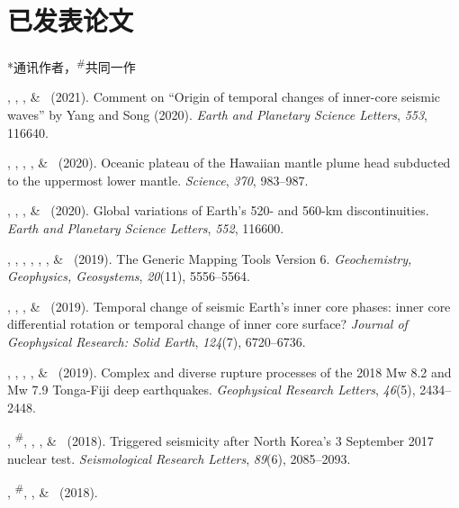\section{已发表论文}
\newcommand{\Revision}{\emph{正在审稿}}
\newcommand{\CS}{*} %
\newcommand{\CF}{\textsuperscript{\#}} %

\CS 通讯作者，\CF 共同一作
\begin{etaremune}
\item \JYao, \Tian, \LSun, \& \LWen\ (2021).
	Comment on ``Origin of temporal changes of inner-core seismic waves'' by Yang and Song (2020).
	\emph{Earth and Planetary Science Letters}, \emph{553}, 116640.
\item \SWei, \PShearer, \CLithgowBertelloni, \LStixrude, \& \Tian\ (2020).
	Oceanic plateau of the Hawaiian mantle plume head subducted to the uppermost lower mantle.
	\emph{Science}, \emph{370}, 983--987.
\item \Tian\CS, \MLv, \SWei, \SDorfman \& \PShearer\ (2020).
	Global variations of Earth's 520- and 560-km discontinuities.
	\emph{Earth and Planetary Science Letters}, \emph{552}, 116600. \\
\item
    \PWessel, \JLuis, \LUieda, \RScharroo, \FWobbe, \WSmith, \& \Tian\ (2019).
    The Generic Mapping Tools Version 6.
    \emph{Geochemistry, Geophysics, Geosystems}, \emph{20}(11), 5556--5564.
\item
    \JYao, \Tian, \LSun, \& \LWen\ (2019).
    Temporal change of seismic Earth's inner core phases: inner core differential rotation or temporal change of inner core surface?
    \emph{Journal of Geophysical Research: Solid Earth}, \emph{124}(7), 6720--6736.
\item
    \WFan, \SWei, \Tian, \JMcGurie, \& \DWiens\ (2019).
    Complex and diverse rupture processes of the 2018 Mw 8.2 and Mw 7.9 Tonga-Fiji deep earthquakes.
    \emph{Geophysical Research Letters}, \emph{46}(5), 2434--2448.
\item
    \JYao, \Tian\CF, \ZLu, \LSun, \& \LWen\ (2018).
    Triggered seismicity after North Korea's 3 September 2017 nuclear test.
    \emph{Seismological Research Letters}, \emph{89}(6), 2085--2093.
\item
    \JYao, \Tian\CF, \LSun, \& \LWen\ (2018).

\end{etaremune}
